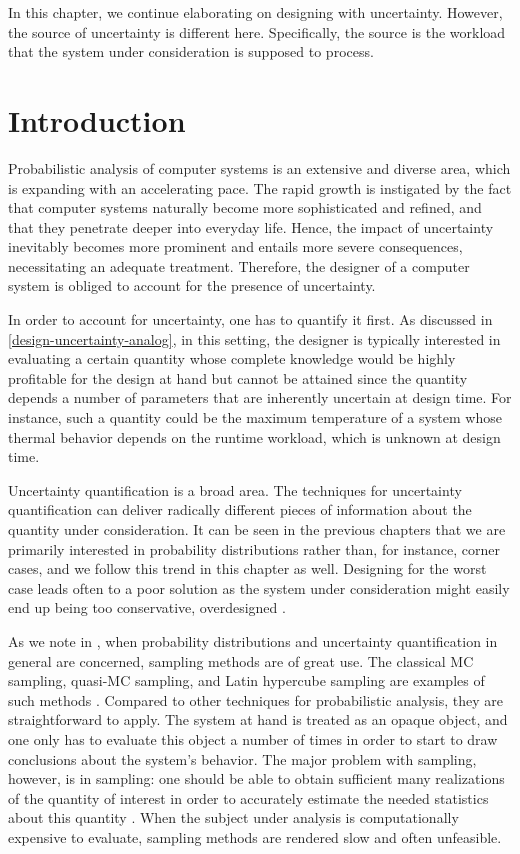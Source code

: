 In this chapter, we continue elaborating on designing with uncertainty. However,
the source of uncertainty is different here. Specifically, the source is the
workload that the system under consideration is supposed to process.

\section{Introduction}

Probabilistic analysis of computer systems is an extensive and diverse area,
which is expanding with an accelerating pace. The rapid growth is instigated by
the fact that computer systems naturally become more sophisticated and refined,
and that they penetrate deeper into everyday life. Hence, the impact of
uncertainty inevitably becomes more prominent and entails more severe
consequences, necessitating an adequate treatment. Therefore, the designer of a
computer system is obliged to account for the presence of uncertainty.

In order to account for uncertainty, one has to quantify it first. As discussed
in \cref{design-uncertainty-analog}, in this setting, the designer is typically
interested in evaluating a certain quantity whose complete knowledge would be
highly profitable for the design at hand but cannot be attained since the
quantity depends a number of parameters that are inherently uncertain at design
time. For instance, such a quantity could be the maximum temperature of a system
whose thermal behavior depends on the runtime workload, which is unknown at
design time.

Uncertainty quantification \cite{maitre2010} is a broad area. The techniques for
uncertainty quantification can deliver radically different pieces of information
about the quantity under consideration. It can be seen in the previous chapters
that we are primarily interested in probability distributions rather than, for
instance, corner cases, and we follow this trend in this chapter as well.
Designing for the worst case leads often to a poor solution as the system under
consideration might easily end up being too conservative, overdesigned
\cite{quinton2012}.

As we note in , when probability distributions and uncertainty
quantification in general are concerned, sampling methods are of great use. The
classical \acf{MC} sampling, quasi-\ac{MC} sampling, and Latin hypercube
sampling are examples of such methods \cite{asmussen2007}. Compared to other
techniques for probabilistic analysis, they are straightforward to apply. The
system at hand is treated as an opaque object, and one only has to evaluate this
object a number of times in order to start to draw conclusions about the
system's behavior. The major problem with sampling, however, is in sampling: one
should be able to obtain sufficient many realizations of the quantity of
interest in order to accurately estimate the needed statistics about this
quantity \cite{diaz-emparanza2002}. When the subject under analysis is
computationally expensive to evaluate, sampling methods are rendered slow and
often unfeasible.

